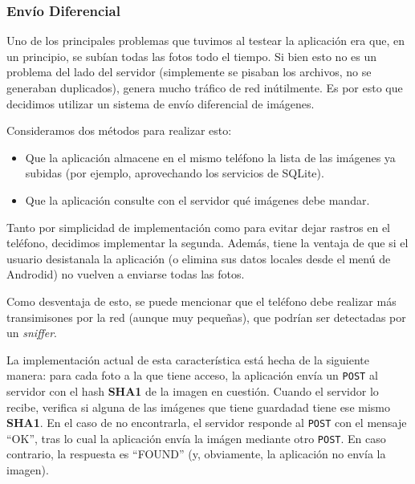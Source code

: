 \documentclass[10pt, a4paper,english,spanish]{article}
\renewcommand{\emph}[1]{\textit{#1}}
\begin{document}

\subsubsection{Envío Diferencial} %
\label{ssub:Envío Diferencial}
Uno de los principales problemas que tuvimos al testear la aplicación era que, en un principio, se subían todas las fotos todo el tiempo. Si bien esto no es un problema del lado del servidor (simplemente se pisaban los archivos, no se generaban duplicados), genera mucho tráfico de red inútilmente. Es por esto que decidimos utilizar un sistema de envío diferencial de imágenes. 

Consideramos dos métodos para realizar esto:
\begin{itemize}
	\item Que la aplicación almacene en el mismo teléfono la lista de las imágenes ya subidas (por ejemplo, aprovechando los servicios de SQLite).
	\item Que la aplicación consulte con el servidor qué imágenes debe mandar. 
\end{itemize}

Tanto por simplicidad de implementación como para evitar dejar rastros en el teléfono, decidimos implementar la segunda. Además, tiene la ventaja de que si el usuario desistanala la aplicación (o elimina sus datos locales desde el menú de Androdid) no vuelven a enviarse todas las fotos. 

Como desventaja de esto, se puede mencionar que el teléfono debe realizar más transimisones por la red (aunque muy pequeñas), que podrían ser detectadas por un \emph{sniffer}.


La implementación actual de esta característica está hecha de la siguiente manera: para cada foto a la que tiene acceso, la aplicación envía un \texttt{POST} al servidor con el hash \textbf{SHA1} de la imagen en cuestión. Cuando el servidor lo recibe, verifica si alguna de las imágenes que tiene guardadad tiene ese mismo \textbf{SHA1}. En el caso de no encontrarla, el servidor responde al \texttt{POST} con el mensaje ``OK'', tras lo cual la aplicación envía la imágen mediante otro \texttt{POST}.
En caso contrario, la respuesta es ``FOUND'' (y, obviamente, la aplicación no envía la imagen).


\end{document}
